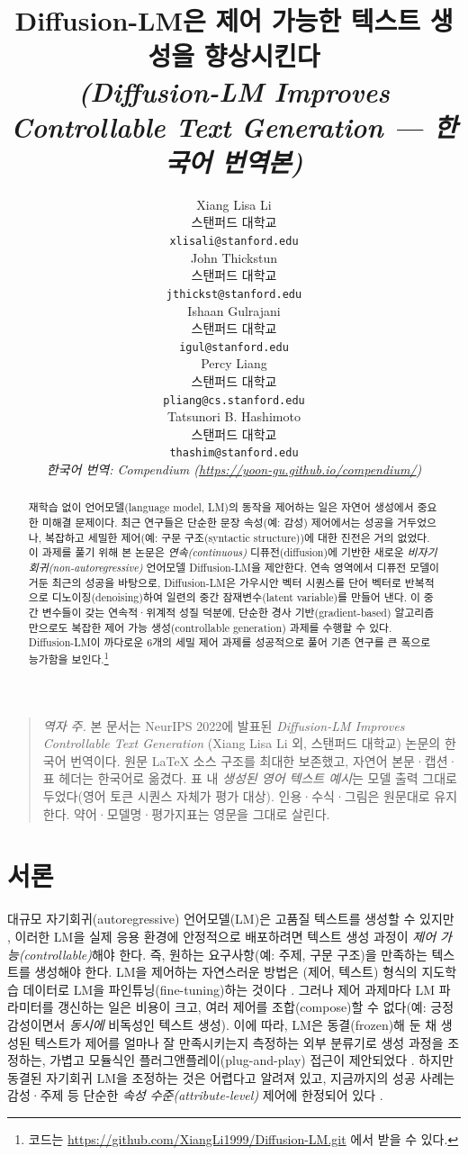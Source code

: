 \documentclass{article}
\title{Diffusion-LM은 제어 가능한 텍스트 생성을 향상시킨다\\ {\normalsize \emph{(Diffusion-LM Improves Controllable Text Generation — 한국어 번역본)}}}
\author{%
  Xiang Lisa Li  \\
  스탠퍼드 대학교\\
  \texttt{xlisali@stanford.edu} \\
  \And
  John Thickstun \\
  스탠퍼드 대학교\\
  \texttt{jthickst@stanford.edu} \\
  \And
  Ishaan Gulrajani \\
  스탠퍼드 대학교 \\
  \texttt{igul@stanford.edu} \\
  \And
  Percy Liang \\
  스탠퍼드 대학교 \\
  \texttt{pliang@cs.stanford.edu} \\
  \And
  Tatsunori B. Hashimoto \\
  스탠퍼드 대학교 \\
  \texttt{thashim@stanford.edu} \\
  \AND
  \textit{한국어 번역: Compendium (\url{https://yoon-gu.github.io/compendium/})}
}
\begin{document}
\maketitle


\begin{abstract}
재학습 없이 언어모델(language model, LM)의 동작을 제어하는 일은 자연어 생성에서 중요한 미해결 문제이다. 최근 연구들은 단순한 문장 속성(예: 감성) 제어에서는 성공을 거두었으나, 복잡하고 세밀한 제어(예: 구문 구조(syntactic structure))에 대한 진전은 거의 없었다.
이 과제를 풀기 위해 본 논문은 \emph{연속(continuous)} 디퓨전(diffusion)에 기반한 새로운 \emph{비자기회귀(non-autoregressive)} 언어모델 Diffusion-LM을 제안한다.
연속 영역에서 디퓨전 모델이 거둔 최근의 성공을 바탕으로, Diffusion-LM은 가우시안 벡터 시퀀스를 단어 벡터로 반복적으로 디노이징(denoising)하여 일련의 중간 잠재변수(latent variable)를 만들어 낸다.
이 중간 변수들이 갖는 연속적·위계적 성질 덕분에, 단순한 경사 기반(gradient-based) 알고리즘만으로도 복잡한 제어 가능 생성(controllable generation) 과제를 수행할 수 있다.
Diffusion-LM이 까다로운 6개의 세밀 제어 과제를 성공적으로 풀어 기존 연구를 큰 폭으로 능가함을 보인다.\footnote{코드는 \url{https://github.com/XiangLi1999/Diffusion-LM.git} 에서 받을 수 있다.}
\end{abstract}

\begin{quote}
\textit{역자 주.} 본 문서는 NeurIPS 2022에 발표된 \emph{Diffusion-LM Improves Controllable Text Generation} (Xiang Lisa Li 외, 스탠퍼드 대학교) 논문의 한국어 번역이다. 원문 LaTeX 소스 구조를 최대한 보존했고, 자연어 본문·캡션·표 헤더는 한국어로 옮겼다. 표 내 \emph{생성된 영어 텍스트 예시}는 모델 출력 그대로 두었다(영어 토큰 시퀀스 자체가 평가 대상). 인용·수식·그림은 원문대로 유지한다. 약어·모델명·평가지표는 영문을 그대로 살린다.
\end{quote}

\section{서론}
\label{sec:intro}

대규모 자기회귀(autoregressive) 언어모델(LM)은 고품질 텍스트를 생성할 수 있지만 \cite{radford2019language,brown-et-al-gpt3,Chowdhery2022PaLMSL,Zhang2022OPT}, 이러한 LM을 실제 응용 환경에 안정적으로 배포하려면 텍스트 생성 과정이 \emph{제어 가능(controllable)}해야 한다. 즉, 원하는 요구사항(예: 주제, 구문 구조)을 만족하는 텍스트를 생성해야 한다.
LM을 제어하는 자연스러운 방법은 (제어, 텍스트) 형식의 지도학습 데이터로 LM을 파인튜닝(fine-tuning)하는 것이다 \cite{Keskar2019CTRL}. 그러나 제어 과제마다 LM 파라미터를 갱신하는 일은 비용이 크고, 여러 제어를 조합(compose)할 수 없다(예: 긍정 감성이면서 \emph{동시에} 비독성인 텍스트 생성).
이에 따라, LM은 동결(frozen)해 둔 채 생성된 텍스트가 제어를 얼마나 잘 만족시키는지 측정하는 외부 분류기로 생성 과정을 조정하는, 가볍고 모듈식인 플러그앤플레이(plug-and-play) 접근이 제안되었다 \cite{Dathathri2020Plug}.
하지만 동결된 자기회귀 LM을 조정하는 것은 어렵다고 알려져 있고, 지금까지의 성공 사례는 감성·주제 등 단순한 \emph{속성 수준(attribute-level)} 제어에 한정되어 있다 \cite{Dathathri2020Plug,KrauseGeDi2020,yang-klein-2021-fudge}.
\end{document}

